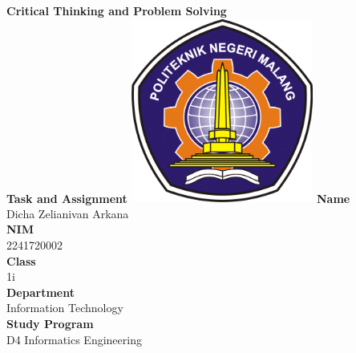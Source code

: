 \documentclass[12pt,titlepage]{article}
\newcommand{\vSubject}{Critical Thinking and Problem Solving}
\newcommand{\vSubtitle}{Task and Assignment}
\newcommand{\vName}{Dicha Zelianivan Arkana}
\newcommand{\vNIM}{2241720002}
\newcommand{\vClass}{1i}
\newcommand{\vDepartment}{Information Technology}
\newcommand{\vStudyProgram}{D4 Informatics Engineering}
\begin{document}
\begin{titlepage}
    \centering
    \vfill
    {\bfseries\LARGE
        \vSubject\\
        \vskip0.25cm
        \vSubtitle
    }
    \vfill
    \includegraphics[width=6cm]{images/polinema-logo.png}
    \vfill
    {
        \textbf{Name}\\
        \vName\\
        \vskip0.5cm
        \textbf{NIM}\\
        \vNIM\\
        \vskip0.5cm
        \textbf{Class}\\
        \vClass\\
        \vskip0.5cm
        \textbf{Department}\\
        \vDepartment\\
        \vskip0.5cm
        \textbf{Study Program}\\
        \vStudyProgram
    }
\end{titlepage}
\end{document}
